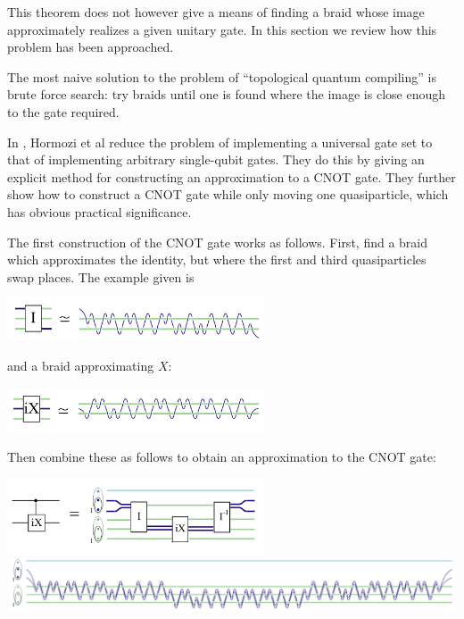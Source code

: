 This theorem does not however give a means of finding a braid whose image
approximately realizes a given unitary gate. In this section we review how this
problem has been approached.

The most naive solution to the problem of ``topological quantum
compiling'' is brute force search: try braids until one is found where the
image is close enough to the gate required.

In \cite{Hormozi2007}, Hormozi et al reduce the problem of implementing a
universal gate set to that of implementing arbitrary single-qubit gates.
They do this by giving an explicit method for constructing an approximation to
a CNOT gate. They further show how to construct a CNOT gate while only moving
one quasiparticle, which has obvious practical significance.

The first construction of the CNOT gate works as follows. First, find a braid
which approximates the identity, but where the first and third quasiparticles
swap places. The example given is

\begin{center}
\includegraphics[width=3in]{I-small.png}
\end{center}

and a braid approximating $X$:


\begin{center}
\includegraphics[width=3in]{X-small.png}
\end{center}

Then combine these as follows to obtain an approximation to the CNOT gate:

\begin{center}
\includegraphics[width=3in]{CNOT-small.png} \\
\includegraphics[width=6in]{CNOT-large.png}
\end{center}

